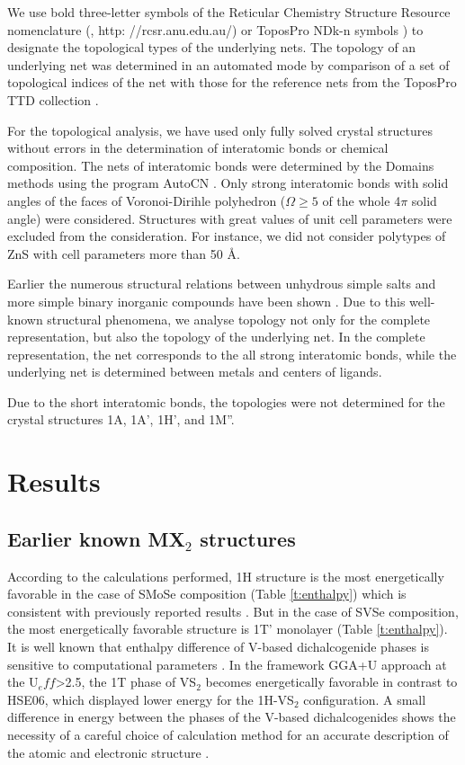 \documentclass[a4paperm]{article}
\begin{document}
We use bold three-letter symbols of the Reticular Chemistry Structure Resource nomenclature (\cite{rcsr}, http: //rcsr.anu.edu.au/) or ToposPro NDk-n symbols \cite{rcsr_2}) to designate the topological types of the underlying nets.
The topology of an underlying net was determined in an automated mode by comparison of a set of topological indices of the net with those for the reference nets from the ToposPro TTD collection \cite{TTD}.

For the topological analysis, we have used only fully solved crystal structures without errors in the determination of interatomic bonds or chemical composition.
The nets of interatomic bonds were determined by the Domains methods using the program AutoCN \cite{blatov2016_rods}. 
Only strong interatomic bonds with solid angles of the faces of Voronoi-Dirihle polyhedron ($\Omega \geq 5 $ of the whole 4$\pi$ solid angle) were considered.
Structures with great values of unit cell parameters were excluded from the consideration.
For instance, we did not consider polytypes of ZnS with cell parameters more than 50 \AA.

Earlier the numerous structural relations between unhydrous simple salts and more simple binary inorganic compounds have been shown \cite{blatov2011_salts, medrish2020_zintl}. 
Due to this well-known structural phenomena, we analyse topology not only for the complete  representation, but also the topology of the underlying net.
In the complete representation, the net corresponds to the all strong interatomic bonds, while the underlying net is determined between metals and centers of ligands.

Due to the short interatomic bonds, the topologies were not determined for the crystal structures 1A, 1A', 1H', and  1M''.


			\section{Results}

\subsection{Earlier known MX$_2$ structures}

According to the calculations performed, 1H structure is the most energetically favorable in the case of SMoSe composition  (Table \ref{t:enthalpy}) which is consistent with previously reported results \cite{wang20182h}. 
But in the case of SVSe composition, the most energetically favorable structure is 1T' monolayer (Table \ref{t:enthalpy}). 
It is well known that enthalpy difference of V-based dichalcogenide phases is sensitive to computational parameters \cite{C6CP06732H}. 
In the framework GGA+U approach at the U$_eff$>2.5, the 1T phase of VS$_2$ becomes energetically favorable \cite{PhysRevB.93.054429} in contrast to HSE06, which displayed lower energy for the 1H-VS$_2$ configuration.
A small difference in energy between the phases of the V-based dichalcogenides shows the necessity of a careful choice of calculation method for an accurate description of the atomic and electronic structure \cite{C6CP06732H}.
\end{document}
